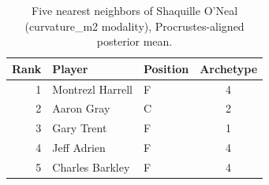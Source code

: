 \begin{table}[htbp]
  \centering\small
  \begin{tabular}{rllc}
    \toprule
    Rank & Player & Position & Archetype \\
    \midrule
    1 & Montrezl Harrell & F & 4 \\
    2 & Aaron Gray & C & 2 \\
    3 & Gary Trent & F & 1 \\
    4 & Jeff Adrien & F & 4 \\
    5 & Charles Barkley & F & 4 \\
    \bottomrule
  \end{tabular}
  \caption{Five nearest neighbors of Shaquille O'Neal (curvature_m2 modality), Procrustes-aligned posterior mean.}
  \label{tab:Shaquille_O_Neal_neighbors_curvature_m2}
\end{table}

